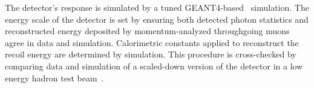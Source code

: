 The \minerva detector's response is simulated by a tuned 
GEANT4-based~\cite{Agostinelli2003250,1610988} simulation.  
The energy scale of the detector is set by ensuring
both detected photon statistics and reconstructed energy deposited by
momentum-analyzed throughgoing muons agree in data and simulation.
Calorimetric constants applied to reconstruct the recoil energy 
are determined by simulation. 
This procedure is cross-checked by comparing data and simulation 
of a scaled-down version of the \minerva detector in a 
low energy hadron test beam~\cite{minerva_nim}.  

